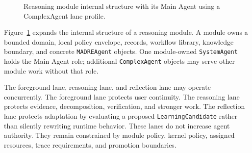 \begin{figure}[H]
{%
	}
	\caption{Reasoning module internal structure with its Main Agent using a ComplexAgent lane profile.}
	\label{fig:madre-complex-agent-module}
\end{figure}

Figure~\ref{fig:madre-complex-agent-module} expands the internal structure of a reasoning module. A module owns a bounded domain, local policy envelope, records, workflow library, knowledge boundary, and concrete \texttt{MADREAgent} objects. One module-owned \texttt{SystemAgent} holds the Main Agent role; additional \texttt{ComplexAgent} objects may serve other module work without that role.

The foreground lane, reasoning lane, and reflection lane may operate concurrently. The foreground lane protects user continuity. The reasoning lane protects evidence, decomposition, verification, and stronger work. The reflection lane protects adaptation by evaluating a proposed \texttt{LearningCandidate} rather than silently rewriting runtime behavior. These lanes do not increase agent authority. They remain constrained by module policy, kernel policy, assigned resources, trace requirements, and promotion boundaries.

